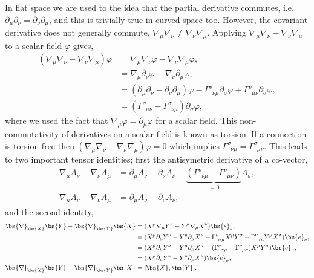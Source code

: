 In flat space we are used to the idea that the partial derivative commutes, i.e. $\partial_\mu \partial_\nu = \partial_\nu \partial_\mu$, and this is trivially true in curved space too. However, the covariant derivative does not generally commute, $\nabla_\mu \nabla_\nu \neq \nabla_\nu \nabla_\mu$. Applying $\nabla_\mu \nabla_\nu - \nabla_\nu \nabla_\mu$ to a scalar field $\varphi$ gives,
\begin{align}
(\nabla_\mu \nabla_\nu  - \nabla_\nu \nabla_\mu )\varphi &= \nabla_\mu \nabla_\nu \varphi - \nabla_\nu \nabla_\mu \varphi , \\
                                               &= \nabla_\mu \partial_\nu \varphi - \nabla_\nu \partial_\mu \varphi , \\
                                               &= (\partial_\mu \partial_\nu  - \partial_\nu \partial_\mu )\varphi -  \Gamma^{\sigma}_{\,\,\,\nu\mu} \partial_\sigma \varphi + \Gamma^{\sigma}_{\,\,\,\mu\nu} \partial_\sigma \varphi,\\ 
                                               &=(\Gamma^{\sigma}_{\,\,\,\mu\nu}  - \Gamma^{\sigma}_{\,\,\,\nu\mu}) \partial_\sigma \varphi, 
\end{align}
where we used the fact that $\nabla_\mu \varphi = \partial_\mu \varphi$ for a scalar field. This non-commutativity of derivatives on a scalar field is known as torsion. If a connection is torsion free then $(\nabla_\mu \nabla_\nu  - \nabla_\nu \nabla_\mu )\varphi=0$ which implies $\Gamma^{\sigma}_{\,\,\,\nu\mu}  = \Gamma^{\sigma}_{\,\,\,\mu\nu}$. This leads to two important tensor identities; first the antisymetric derivative of a co-vector,
\begin{align} 
\nabla_\mu A_\nu - \nabla_\nu A_\mu &= \partial_\mu A_\nu - \partial_\nu A_\nu - \underbrace{(\Gamma^\sigma_{\,\,\,\nu\mu}- \Gamma^\sigma_{\,\,\,\mu\nu})}_{=0}A_\sigma, \\
\nabla_\mu A_\nu - \nabla_\nu A_\mu &= \partial_\mu A_\nu - \partial_\nu A_\nu, 
\end{align}
and the second identity,
\begin{align} 
\bs{\nabla}_{\bs{X}} \bs{Y} - \bs{\nabla}_{\bs{Y}}\bs{X} &= (X^\mu \nabla_\mu Y^\nu - Y^\mu \nabla_\mu X^\nu ) \bs{e}_\nu, \\
&= (X^\mu \partial_\mu Y^\nu - Y^\mu \partial_\mu X^\nu  + \Gamma^\nu_{\,\,\,\sigma\mu} X^\mu Y^\sigma - \Gamma^\nu_{\,\,\,\sigma\mu} Y^\mu X^\sigma) \bs{e}_\nu, \\ 
&= (X^\mu \partial_\mu Y^\nu - Y^\mu \partial_\mu X^\nu  + (\Gamma^\nu_{\,\,\,\sigma\mu}  - \Gamma^\nu_{\,\,\,\mu\sigma}) X^\mu Y^\sigma) \bs{e}_\nu, \\ 
&= (X^\mu \partial_\mu Y^\nu - Y^\mu \partial_\mu X^\nu  ) \bs{e}_\nu, \\ \bs{\nabla}_{\bs{X}} \bs{Y} - \bs{\nabla}_{\bs{Y}}\bs{X}&= [\bs{X},\bs{Y}]. 
\end{align}
